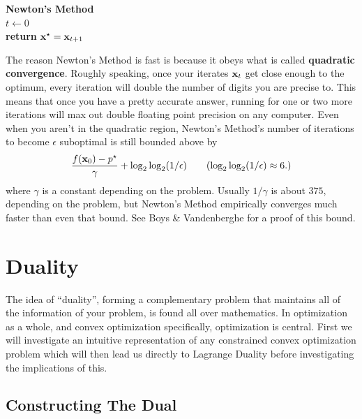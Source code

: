 \documentclass{article}
\begin{document}
\IncMargin{1em}
\begin{algorithm}
    \textbf{Newton's Method}\\
    $t \leftarrow 0$\\
    \textbf{return } ${\bf x}^\star = {\bf x}_{t+1}$
\end{algorithm}

The reason Newton's Method is fast is because it obeys what is called \textbf{quadratic
convergence}. Roughly speaking, once your iterates ${\bf x}_t$ get close enough to the optimum,
every iteration will double the number of digits you are precise to. This means that once
you have a pretty accurate answer, running for one or two more iterations will max out
double floating point precision on any computer. Even when you aren't in the quadratic region,
Newton's Method's number of iterations to become $\epsilon$ suboptimal is still bounded above
by
\[
    \frac{f({\bf x}_0)-p^\star}{\gamma} + \log_2\log_2(1/\epsilon) \tag{$\log_2\log_2(1/\epsilon)\approx6.$}
\]
where $\gamma$ is a constant depending on the problem. Usually $1/\gamma$ is about $375$,
depending on the problem, but Newton's Method empirically converges much faster than even
that bound. See Boys \& Vandenberghe for a proof of this bound.

\section{Duality}

The idea of ``duality'', forming a complementary problem that maintains
all of the information of your problem, is found all over mathematics.
In optimization as a whole, and convex optimization specifically, optimization
is central. First we will investigate an intuitive representation of any
constrained convex optimization problem which will then lead us directly to
Lagrange Duality before investigating the implications of this.

\subsection{Constructing The Dual}
\end{document}
